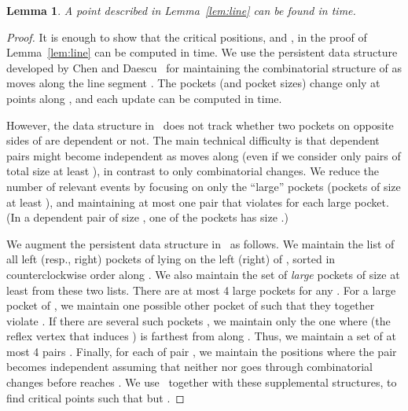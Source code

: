 \documentclass[12pt]{article}
\newtheorem{lemma}{Lemma}
\begin{document}
\begin{lemma}\label{lem:line2}
A point  described in Lemma~\ref{lem:line} can be found in  time.
\end{lemma}
\begin{proof}
It is enough to show that the critical positions,  and , in the proof of Lemma~\ref{lem:line} can be computed in  time. We use the persistent data structure developed
by Chen and Daescu~\cite{CD98} for maintaining the combinatorial structure of  as  moves along the line segment . The pockets (and pocket sizes) change only at  points
along , and each update can be computed in  time.

However, the data structure in~\cite{CD98} does not track whether two pockets on opposite sides
of  are dependent or not. The main technical difficulty is that  dependent pairs might become independent as  moves along  (even if we consider only pairs of total  size at least ), in contrast to only  combinatorial changes. We reduce the number of relevant events by focusing on only the ``large'' pockets (pockets of size at least ), and maintaining at most one pair that violates  for each large pocket. (In a dependent pair of size , one of the pockets has size .)

We augment the persistent data structure in~\cite{CD98} as follows. We maintain the list of all left (resp., right) pockets of  lying on the left (right) of , sorted in counterclockwise order along . We also maintain the set of \emph{large} pockets of size at least  from these two lists. There are at most 4 large pockets for any .
For a large pocket  of , we maintain one possible other pocket  of  such that they together violate . If there are several such pockets , we maintain only the one where  (the reflex vertex that induces ) is farthest from  along . Thus, we maintain a set  of at most 4 pairs . Finally, for each of pair , we maintain the positions  where the pair  becomes independent assuming that neither  nor  goes through combinatorial changes before  reaches . We use~\cite{CD98} together with these supplemental structures, to find critical points  such that  but .


\end{proof}
\end{document}
